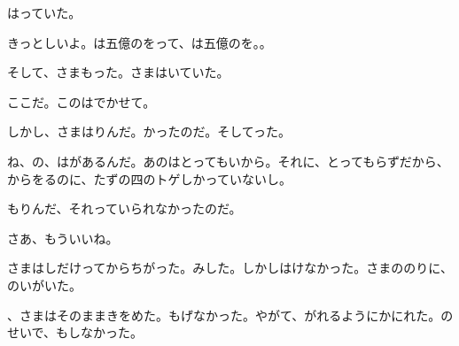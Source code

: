 はっていた。

きっとしいよ。は五億のをって、は五億のを。。

そして、さまもった。さまはいていた。

ここだ。このはでかせて。

しかし、さまはりんだ。かったのだ。そしてった。

ね、の、はがあるんだ。あのはとってもいから。それに、とってもらずだから、からをるのに、たずの四のトゲしかっていないし。

もりんだ、それっていられなかったのだ。

さあ、もういいね。

さまはしだけってからちがった。みした。しかしはけなかった。さまののりに、のいがいた。

、さまはそのままきをめた。もげなかった。やがて、がれるようにかにれた。のせいで、もしなかった。


